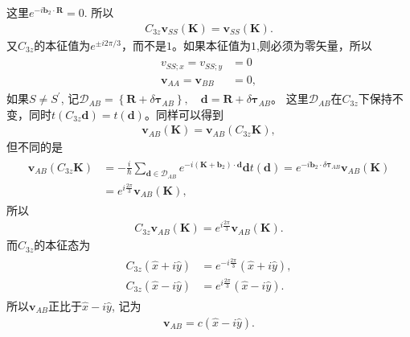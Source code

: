 \documentclass[10pt, oneside]{article}
\begin{document}
这里\(e^{-i \bm{b}_{2} \cdot\bm{R}} = 0\). 所以
\begin{align}
	C_{3z} \bm{v }_{SS} \left(\bm{K}\right) =\bm{v }_{SS} \left(\bm{K}\right) .
\end{align}
又\(C_{3z}\)的本征值为\(e^{\pm i 2 \pi/3}\)，而不是\(1\)。如果本征值为\(1\),则必须为零矢量，所以
\begin{align}
	\begin{split}
		v_{SS;x } = v_{SS;y} &= 0 \\
		\bm{v}_{AA} = \bm{v}_{BB} &= 0,
	\end{split}
\end{align}
如果\(S \neq S^{\prime}\), 记\(\mathcal{D }_{AB} = \left\{\bm{R}+ \delta \bm{\tau}_{AB}\right\}, \quad \bm{d } = \bm{R}+ \delta \bm{\tau}_{AB}\)。 这里\(\mathcal{D }_{AB}\)在\(C_{3z}\)下保持不变，同时\(t \left(C_{3z} \bm{d }\right) = t \left(\bm{d }\right)\)。同样可以得到
\begin{align}
	\bm{v }_{AB } \left(\bm{K }\right) = \bm{v }_{AB } \left(C_{3z} \bm{K }\right),
\end{align}
但不同的是
\begin{align}
	\begin{split}
		\bm{v }_{AB } \left(C_{3z} \bm{K }\right) &= - \frac{i }{\hbar} \sum_{\bm{d } \in \mathcal{D }_{AB}} e^{-i \left(\bm{K } + \bm{b }_2\right)\cdot \bm{d }} \bm{d } t \left(\bm{d}\right)  = e^{-i \bm{b }_{2} \cdot \delta \bm{\tau}_{AB} } \bm{v }_{AB} \left(\bm{K}\right) \\
		& = e^{i \frac{2 \pi}{3}} \bm{v }_{AB } \left(\bm{K }\right),
	\end{split}
\end{align}
所以
\begin{align}
	C_{3z} \bm{v }_{AB } \left(\bm{K }\right) = e^{i \frac{2 \pi}{3}} \bm{v }_{AB } \left(\bm{K }\right).
\end{align}
而\(C_{3z}\)的本征态为
\begin{align}
	\begin{split}
		C_{3z} \left(\hat{x} + i \hat{y}\right) &= e^{ - i \frac{2 \pi}{3}} \left(\hat{x} + i \hat{y}\right) ,\\
		C_{3z} \left(\hat{x} - i \hat{y}\right) &= e^{ i \frac{2 \pi}{3}} \left(\hat{x} - i \hat{y}\right).
	\end{split}
\end{align}
所以\(\bm{v }_{AB}\)正比于\(\hat{x } - i \hat{y}\), 记为
\begin{align}
	\bm{v }_{AB} = c \left(\hat{x } - i \hat{y}\right).
\end{align}
\end{document}

